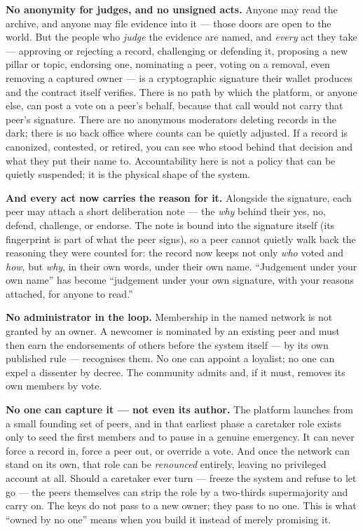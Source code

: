\documentclass[11pt,a4paper]{article}
\begin{document}
\textbf{No anonymity for judges, and no unsigned acts.} Anyone may read
the archive, and anyone may file evidence into it --- those doors are
open to the world. But the people who \emph{judge} the evidence are
named, and \emph{every} act they take --- approving or rejecting a
record, challenging or defending it, proposing a new pillar or topic,
endorsing one, nominating a peer, voting on a removal, even removing a
captured owner --- is a cryptographic signature their wallet produces
and the contract itself verifies. There is no path by which the
platform, or anyone else, can post a vote on a peer's behalf, because
that call would not carry that peer's signature. There are no anonymous
moderators deleting records in the dark; there is no back office where
counts can be quietly adjusted. If a record is canonized, contested, or
retired, you can see who stood behind that decision and what they put
their name to. Accountability here is not a policy that can be quietly
suspended; it is the physical shape of the system.

\textbf{And every act now carries the reason for it.} Alongside the
signature, each peer may attach a short deliberation note --- the
\emph{why} behind their yes, no, defend, challenge, or endorse. The note
is bound into the signature itself (its fingerprint is part of what the
peer signs), so a peer cannot quietly walk back the reasoning they were
counted for: the record now keeps not only \emph{who} voted and
\emph{how}, but \emph{why}, in their own words, under their own name.
``Judgement under your own name'' has become ``judgement under your own
signature, with your reasons attached, for anyone to read.''

\textbf{No administrator in the loop.} Membership in the named network is
not granted by an owner. A newcomer is nominated by an existing peer and
must then earn the endorsements of others before the system itself --- by
its own published rule --- recognises them. No one can appoint a loyalist; no
one can expel a dissenter by decree. The community admits and, if it must,
removes its own members by vote.

\textbf{No one can capture it --- not even its author.} The platform launches
from a small founding set of peers, and in that earliest phase a caretaker
role exists only to seed the first members and to pause in a genuine
emergency. It can never force a record in, force a peer out, or override a
vote. And once the network can stand on its own, that role can be
\emph{renounced} entirely, leaving no privileged account at all. Should a
caretaker ever turn --- freeze the system and refuse to let go --- the peers
themselves can strip the role by a two-thirds supermajority and carry on.
The keys do not pass to a new owner; they pass to no one. This is what
``owned by no one'' means when you build it instead of merely promising it.
\end{document}
